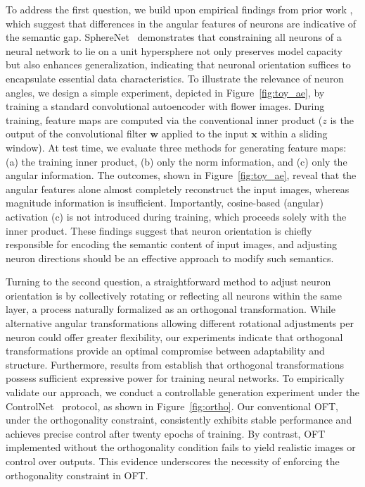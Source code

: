 To address the first question, we build upon empirical findings from prior work \cite{liu2018decoupled,chen2020angular}, which suggest that differences in the angular features of neurons are indicative of the semantic gap. SphereNet~\cite{liu2017deep} demonstrates that constraining all neurons of a neural network to lie on a unit hypersphere not only preserves model capacity but also enhances generalization, indicating that neuronal orientation suffices to encapsulate essential data characteristics. To illustrate the relevance of neuron angles, we design a simple experiment, depicted in Figure~\ref{fig:toy_ae}, by training a standard convolutional autoencoder with flower images. During training, feature maps are computed via the conventional inner product ($z$ is the output of the convolutional filter $\bm{w}$ applied to the input $\bm{x}$ within a sliding window). At test time, we evaluate three methods for generating feature maps: (a) the training inner product, (b) only the norm information, and (c) only the angular information. The outcomes, shown in Figure~\ref{fig:toy_ae}, reveal that the angular features alone almost completely reconstruct the input images, whereas magnitude information is insufficient. Importantly, cosine-based (angular) activation (c) is not introduced during training, which proceeds solely with the inner product. These findings suggest that neuron orientation is chiefly responsible for encoding the semantic content of input images, and adjusting neuron directions should be an effective approach to modify such semantics.

Turning to the second question, a straightforward method to adjust neuron orientation is by collectively rotating or reflecting all neurons within the same layer, a process naturally formalized as an orthogonal transformation. While alternative angular transformations allowing different rotational adjustments per neuron could offer greater flexibility, our experiments indicate that orthogonal transformations provide an optimal compromise between adaptability and structure. Furthermore, results from \cite{liu2021orthogonal} establish that orthogonal transformations possess sufficient expressive power for training neural networks. To empirically validate our approach, we conduct a controllable generation experiment under the ControlNet~\cite{zhang2023adding} protocol, as shown in Figure~\ref{fig:ortho}. Our conventional OFT, under the orthogonality constraint, consistently exhibits stable performance and achieves precise control after twenty epochs of training. By contrast, OFT implemented without the orthogonality condition fails to yield realistic images or control over outputs. This evidence underscores the necessity of enforcing the orthogonality constraint in OFT.

